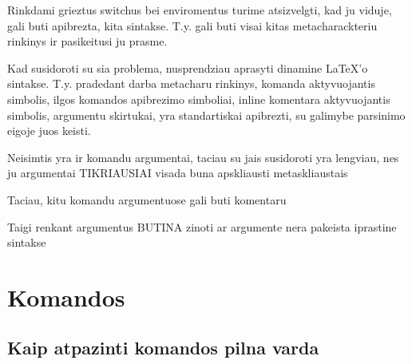 \documentclass{article}
\begin{document}
Rinkdami grieztus switchus bei enviromentus turime atsizvelgti,
kad ju viduje, gali buti apibrezta, kita sintakse. 
T.y. gali buti visai kitas metacharackteriu rinkinys ir pasikeitusi ju prasme.


Kad susidoroti su sia problema, nusprendziau aprasyti dinamine LaTeX'o
sintakse. T.y. pradedant darba metacharu 
rinkinys, %
komanda aktyvuojantis simbolis, %
ilgos komandos apibrezimo simboliai, %
inline komentara aktyvuojantis simbolis, %
argumentu skirtukai, %
yra standartiskai apibrezti, su galimybe parsinimo eigoje juos keisti.

Neisimtis yra ir komandu argumentai, 
taciau su jais susidoroti yra lengviau, nes ju argumentai
TIKRIAUSIAI visada buna apskliausti metaskliaustais %

Taciau, kitu komandu argumentuose gali buti komentaru

Taigi renkant argumentus BUTINA zinoti ar argumente nera pakeista 
iprastine sintakse

\section{Komandos}

\subsection{Kaip atpazinti komandos pilna varda}
\end{document}
